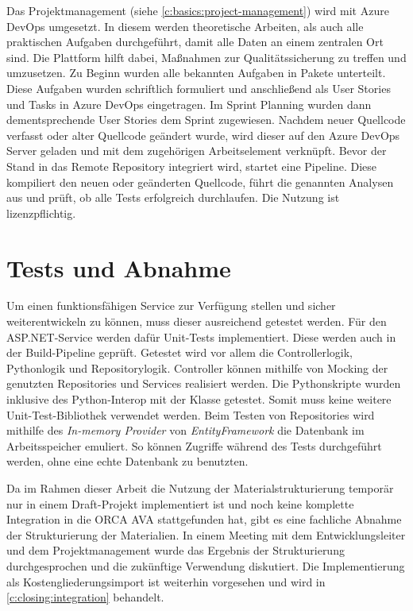 Das Projektmanagement (siehe \autoref{c:basics:project-management}) wird mit Azure DevOps umgesetzt. In diesem werden theoretische Arbeiten, als auch alle praktischen Aufgaben durchgeführt, damit alle Daten an einem zentralen Ort sind. Die Plattform hilft dabei, Maßnahmen zur Qualitätssicherung zu treffen und umzusetzen. Zu Beginn wurden alle bekannten Aufgaben in Pakete unterteilt. Diese Aufgaben wurden schriftlich formuliert und anschließend als User Stories und Tasks in Azure DevOps eingetragen. Im Sprint Planning wurden dann dementsprechende User Stories dem Sprint zugewiesen. Nachdem neuer Quellcode verfasst oder alter Quellcode geändert wurde, wird dieser auf den Azure DevOps Server geladen und mit dem zugehörigen Arbeitselement verknüpft. Bevor der Stand in das Remote Repository integriert wird, startet eine Pipeline. Diese kompiliert den neuen oder geänderten Quellcode, führt die genannten Analysen aus und prüft, ob alle Tests erfolgreich durchlaufen. Die Nutzung ist lizenzpflichtig.

\section{Tests und Abnahme}
\label{c:qs:tests}
Um einen funktionsfähigen Service zur Verfügung stellen und sicher weiterentwickeln zu können, muss dieser ausreichend getestet werden. Für den ASP.NET-Service werden dafür Unit-Tests implementiert. Diese werden auch in der Build-Pipeline geprüft. Getestet wird vor allem die Controllerlogik, Pythonlogik und Repositorylogik. Controller können mithilfe von Mocking der genutzten Repositories und Services realisiert werden. Die Pythonskripte wurden inklusive des Python-Interop mit der Klasse  getestet. Somit muss keine weitere Unit-Test-Bibliothek verwendet werden. Beim Testen von Repositories wird mithilfe des \textit{In-memory Provider} von \textit{EntityFramework} die Datenbank im Arbeitsspeicher emuliert. So können Zugriffe während des Tests durchgeführt werden, ohne eine echte Datenbank zu benutzten.

Da im Rahmen dieser Arbeit die Nutzung der Materialstrukturierung temporär nur in einem Draft-Projekt implementiert ist und noch keine komplette Integration in die ORCA AVA stattgefunden hat, gibt es eine fachliche Abnahme der Strukturierung der Materialien. In einem Meeting mit dem Entwicklungsleiter und dem Projektmanagement wurde das Ergebnis der Strukturierung durchgesprochen und die zukünftige Verwendung diskutiert. Die Implementierung als Kostengliederungsimport ist weiterhin vorgesehen und wird in \autoref{c:closing:integration} behandelt.

